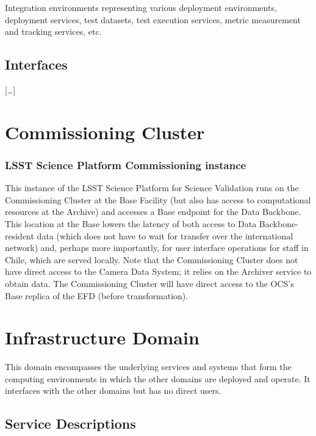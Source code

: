 \documentclass[]{article}
\begin{document}
Integration environments representing various deployment environments,
deployment services, test datasets, test execution services, metric
measurement and tracking services, etc.

\subsection{Interfaces}\label{interfaces-4}

{[}\ldots{}{]}

\section{Commissioning Cluster}\label{commissioning-cluster}

\subsubsection{LSST Science Platform Commissioning
instance}\label{lsst-science-platform-commissioning-instance}

This instance of the LSST Science Platform for Science Validation runs
on the Commissioning Cluster at the Base Facility (but also has access
to computational resources at the Archive) and accesses a Base endpoint
for the Data Backbone. This location at the Base lowers the latency of
both access to Data Backbone-resident data (which does not have to wait
for transfer over the international network) and, perhaps more
importantly, for user interface operations for staff in Chile, which are
served locally. Note that the Commissioning Cluster does not have direct
access to the Camera Data System; it relies on the Archiver service to
obtain data. The Commissioning Cluster will have direct access to the
OCS's Base replica of the EFD (before transformation).

\section{Infrastructure Domain}\label{infrastructure-domain}

This domain encompasses the underlying services and systems that form
the computing environments in which the other domains are deployed and
operate. It interfaces with the other domains but has no direct users.

\subsection{Service Descriptions}\label{service-descriptions-5}
\end{document}
